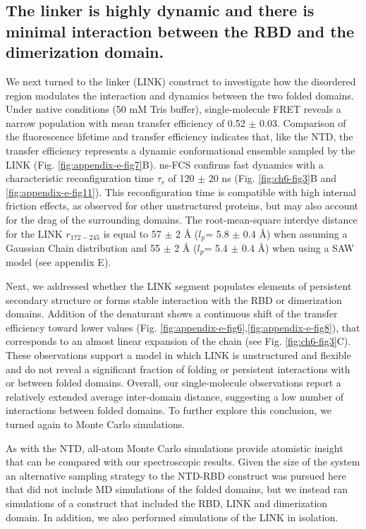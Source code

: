 \documentclass[../main.tex]{subfiles}
\begin{document}
    \subsection{The linker is highly dynamic and there is minimal interaction between the RBD and the dimerization domain.}
        We next turned to the linker (LINK) construct to investigate how the disordered region modulates the interaction and dynamics between the two folded domains. Under native conditions (50 mM Tris buffer), single-molecule FRET reveals a narrow population with mean transfer efficiency of 0.52 $\pm$ 0.03. Comparison of the fluorescence lifetime and transfer efficiency indicates that, like the NTD, the transfer efficiency represents a dynamic conformational ensemble sampled by the LINK (Fig. \ref{fig:appendix-e-fig7}B). ns-FCS confirms fast dynamics with a characteristic reconfiguration time $\tau _r$ of 120 $\pm$ 20 ns (Fig. \ref{fig:ch6-fig3}B and \ref{fig:appendix-e-fig11}). This reconfiguration time is compatible with high internal friction effects, as observed for other unstructured proteins\cite{Soranno2012-jn,Borgia2012-tz}, but may also account for the drag of the surrounding domains. The root-mean-square interdye distance for the LINK $r_{172-245}$ is equal to 57 $\pm$ 2 \AA{} ($l_p$= 5.8 $\pm$ 0.4 \AA{}) when assuming a Gaussian Chain distribution and 55 $\pm$ 2 \AA{} ($l_p$= 5.4 $\pm$ 0.4 \AA{}) when using a SAW model (see appendix E). 

        Next, we addressed whether the LINK segment populates elements of persistent secondary structure or forms stable interaction with the RBD or dimerization domains. Addition of the denaturant shows a continuous shift of the transfer efficiency toward lower values (Fig. \ref{fig:appendix-e-fig6},\ref{fig:appendix-e-fig8}), that corresponds to an almost linear expansion of the chain (see Fig. \ref{fig:ch6-fig3}C). These observations support a model in which LINK is unstructured and flexible and do not reveal a significant fraction of folding or persistent interactions with or between folded domains.  Overall, our single-molecule observations report a relatively extended average inter-domain distance, suggesting a low number of interactions between folded domains. To further explore this conclusion, we turned again to Monte Carlo simulations.

        As with the NTD, all-atom Monte Carlo simulations provide atomistic insight that can be compared with our spectroscopic results. Given the size of the system an alternative sampling strategy to the NTD-RBD construct was pursued here that did not include MD simulations of the folded domains, but we instead ran simulations of a construct that included the RBD, LINK and dimerization domain. In addition, we also performed simulations of the LINK in isolation. 
\end{document}
